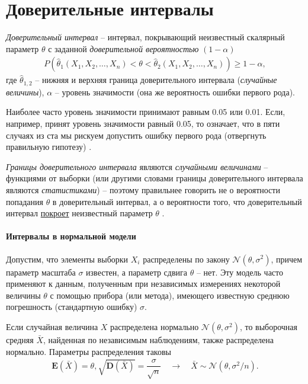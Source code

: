 \documentclass[%
	11pt,
	a4paper,
	utf8,
		]{article}
\begin{document}
\section{Доверительные интервалы}

\emph{Доверительный интервал} -- интервал, покрывающий неизвестный скалярный параметр $ \theta $ с заданной \emph{доверительной вероятностью} $ (1 - \alpha) $
\begin{align*}
	P(\hat{\theta}_1(X_1, X_2, \dots, X_n) < \theta < \hat{\theta}_2(X_1, X_2, \dots, X_n)) \geqslant 1 - \alpha,
\end{align*}
где $ \hat{\theta}_{1,2} $ -- нижняя и верхняя граница доверительного интервала (\emph{случайные величины}), $ \alpha $ -- уровень значимости (она же вероятность ошибки первого рода).

Наиболее часто уровень значимости принимают равным 0.05 или 0.01. Если, например, принят уровень значимости равный 0.05, то означает, что в пяти случаях из ста мы рискуем допустить ошибку первого рода (отвергнуть правильную гипотезу) \cite[284]{gmurman:1972}.

\emph{Границы доверительного интервала} являются \emph{случайными величинами} -- функциями от выборки (или другими словами границы доверительного интервала являются \emph{статистиками}) -- поэтому правильнее говорить не о вероятности попадания $ \theta $ в доверительный интервал, а о вероятности того, что доверительный интервал \underline{покроет} неизвестный параметр $ \theta $ \cite[216]{gmurman:1972}.

\paragraph{Интервалы в нормальной модели} Допустим, что элементы выборки $ X_i $ распределены по закону $ \mathcal{N}(\theta, \sigma^2) $, причем параметр масштаба $ \sigma $ известен, а параметр сдвига $ \theta $ -- нет. Эту модель часто применяют к данным, полученным при независимых измерениях некоторой величины $ \theta $ с помощью прибора (или метода), имеющего известную среднюю погрешность (стандартную ошибку) $ \sigma $.

Если случайная величина $ X $ распределена нормально $ \mathcal{N}(\theta, \sigma^2) $, то выборочная средняя $ \bar{X} $, найденная по независимым наблюдениям, также распределена нормально. Параметры распределения таковы \cite{gmurman:1972}
\begin{align*}
	\mathbf{E}(\bar{X}) = \theta, \sqrt{\mathbf{D}(\bar{X})} = \dfrac{\sigma}{\sqrt{n}} \quad \to \quad \bar{X} \sim \mathcal{N}(\theta, \sigma^2/n).
\end{align*}
\end{document}
